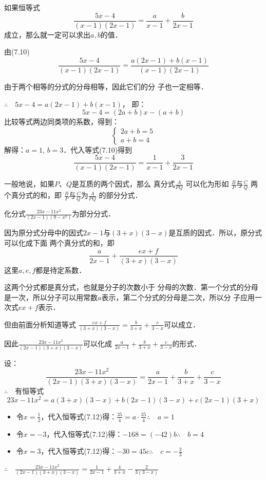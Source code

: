 如果恒等式
\begin{equation}
    \frac{5x-4}{(x-1)(2x-1)}=\frac{a}{x-1}+\frac{b}{2x-1}
\end{equation}
成立，那么就一定可以求出$a,b$的值．

由(7.10)
\[    \frac{5x-4}{(x-1)(2x-1)}=\frac{a(2x-1)+b(x-1)}{(x-1)(2x-1)}\]

由于两个相等的分式的分母相等，因此它们的分
子也一定相等．

$\therefore\quad 5x-4=a(2x-1)+b(x-1)$，
即：
\[5x-4=(2a+b)x-(a+b)\]
比较等式两边同类项的系数，得到：
\[\begin{cases}
    2a+b=5\\  a+b=4
\end{cases}\]
解得：$a=1$, $b=3$．代入等式(7.10)得到
\[\frac{5x-4}{(x-1)(2x-1)}=\frac{1}{x-1}+\frac{3}{2x-1}\]

一般地说，如果$P$、$Q$是互质的两个因式，那么
真分式$\frac{A}{PQ}$
可以化为形如
$\frac{B}{P}$与$\frac{C}{Q}$
两个真分式的和，即
$\frac{B}{P}$与$\frac{C}{Q}$为$\frac{A}{PQ}$
的部分分式．

\begin{example}
    化分式$\frac{23x-11x^2}{(2x-1)(9-x^2)}$为部分分式．
\end{example}

\begin{analyze}
    因为原分式分母中的因式$2x-1$与$(3+x)(3-x)$是互质的因式．所以，原分式可以化成下面
两个真分式的和，即
\[\frac{a}{2x-1}+\frac{ex+f}{(3+x)(3-x)}\]
这里$a,e,f$都是待定系数．

这两个分式都是真分式，也就是分子的次数小于
分母的次数．第一个分式的分母是一次，所以分子可以用常数$a$表示，第二个分式的分母是二次，所以分
子应用一次式$ex+f$表示．

但由前面分析知道等式
$\frac{ex+f}{(3+x)(3-x)}=\frac{b}{3+x}+\frac{c}{3-x}$可以成立．

因此$\frac{23x-11x^2}{(2x-1)(3+x)(3-x)}$可以化成 $\frac{a}{2x-1}+\frac{b}{3+x}+\frac{c}{3-x}$的形式．
\end{analyze}

\begin{solution}
设：
\begin{equation}
    \frac{23x-11x^2}{(2x-1)(3+x)(3-x)}=\frac{a}{2x-1}+\frac{b}{3+x}+\frac{c}{3-x}
\end{equation}
$\therefore\quad $有恒等式
\begin{equation}
    23x-11x^2=a(3+x)(3-x)+b(2x-1)(3-x)+c(2x-1)(3+x)
\end{equation}

\begin{itemize}
    \item 令$x=\frac{1}{2}$，代入恒等式(7.12)得：$\frac{35}{4}=a\cdot \frac{35}{4}$\qquad$\therefore\quad a=1$
    \item 令$x=-3$，代入恒等式(7.12)得：$-168=(-42)b$\qquad  $\therefore\quad b=4$
    \item 令$x=3$，代入恒等式(7.12)得：$-30=45c$\qquad$\therefore\quad c=-\frac{2}{3}$
\end{itemize}
$\therefore\quad  \frac{23x-11x^2}{(2x-1)(3+x)(3-x)}=\frac{1}{2x-1}+\frac{4}{3+x}-\frac{2}{3(3-x)}$
\end{solution}

